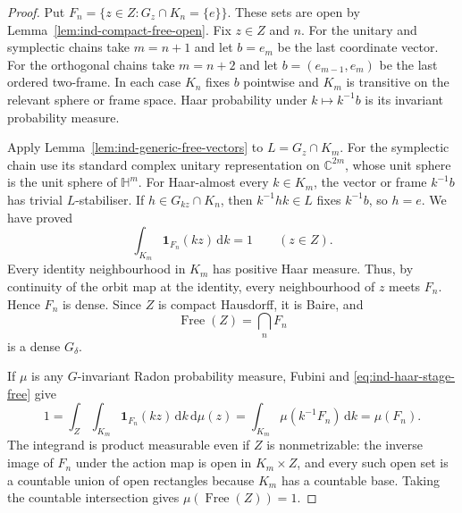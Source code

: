\begin{proof}
Put $F_n=\{z\in Z:G_z\cap K_n=\{e\}\}$. These sets are open
by Lemma~\ref{lem:ind-compact-free-open}. Fix $z\in Z$ and $n$.
For the unitary and symplectic chains take $m=n+1$ and let $b=e_m$
be the last coordinate vector. For the orthogonal chains take
$m=n+2$ and let $b=(e_{m-1},e_m)$ be the last ordered two-frame.
In each case $K_n$ fixes $b$ pointwise and $K_m$ is transitive on
the relevant sphere or frame space. Haar probability under
$k\mapsto k^{-1}b$ is its invariant probability measure.

Apply Lemma~\ref{lem:ind-generic-free-vectors} to $L=G_z\cap K_m$.
For the symplectic chain use its standard complex unitary
representation on $\mathbb C^{2m}$, whose unit sphere is the unit sphere
of $\mathbb H^m$. For Haar-almost every $k\in K_m$, the vector
or frame $k^{-1}b$ has trivial $L$-stabiliser. If
$h\in G_{kz}\cap K_n$, then $k^{-1}hk\in L$ fixes $k^{-1}b$,
so $h=e$. We have proved
\begin{equation}\label{eq:ind-haar-stage-free}
\int_{K_m}\mathbf1_{F_n}(kz)\,\mathrm d k=1\qquad(z\in Z).
\end{equation}
Every identity neighbourhood in $K_m$ has positive Haar measure.
Thus, by continuity of the orbit map at the identity, every
neighbourhood of $z$ meets $F_n$. Hence $F_n$ is dense. Since $Z$
is compact Hausdorff, it is Baire, and
\[
\operatorname{Free}(Z)=\bigcap_n F_n
\]
is a dense $G_\delta$.

If $\mu$ is any $G$-invariant Radon probability measure, Fubini and
\eqref{eq:ind-haar-stage-free} give
\[
1=\int_Z\int_{K_m}\mathbf1_{F_n}(kz)\,\mathrm d k\,\mathrm d\mu(z)
=\int_{K_m}\mu(k^{-1}F_n)\,\mathrm d k=\mu(F_n).
\]
The integrand is product measurable even if $Z$ is nonmetrizable:
the inverse image of $F_n$ under the action map is open in
$K_m\times Z$, and every such open set is a countable union of
open rectangles because $K_m$ has a countable base. Taking the
countable intersection gives $\mu(\operatorname{Free}(Z))=1$.
\end{proof}

